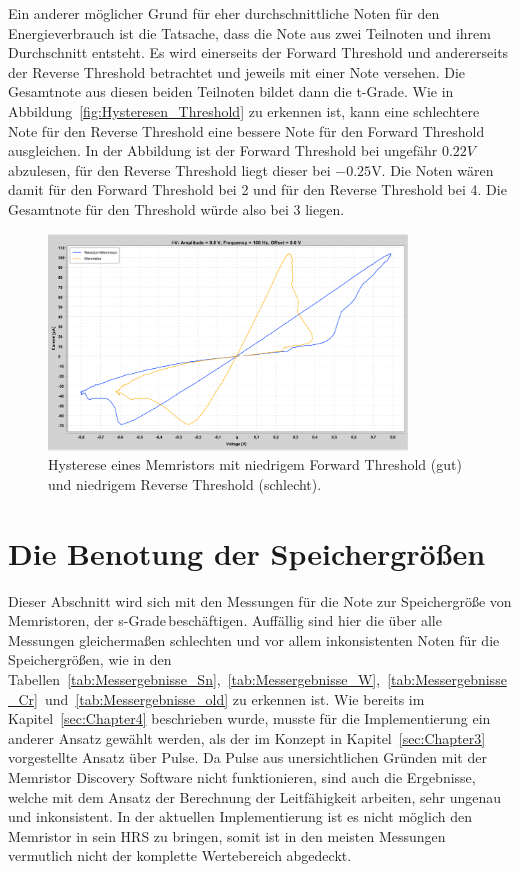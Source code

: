 Ein anderer möglicher Grund für eher durchschnittliche Noten für den Energieverbrauch ist die Tatsache, dass die Note aus zwei Teilnoten und ihrem Durchschnitt entsteht. Es wird einerseits der Forward Threshold und andererseits der Reverse Threshold betrachtet und jeweils mit einer Note versehen. Die Gesamtnote aus diesen beiden Teilnoten bildet dann die t-Grade. Wie in Abbildung~\ref{fig:Hysteresen_Threshold} zu erkennen ist, kann eine schlechtere Note für den Reverse Threshold eine bessere Note für den Forward Threshold ausgleichen. In der Abbildung ist der Forward Threshold bei ungefähr $0.22V$ abzulesen, für den Reverse Threshold liegt dieser bei $-0.25$V. Die Noten wären damit für den Forward Threshold bei 2 und für den Reverse Threshold bei 4. Die Gesamtnote für den Threshold würde also bei 3 liegen.

\begin{figure}
  \centering
    \includegraphics[width=0.85\textwidth]{images/Threshold_Hysterese2.png}
  \caption{Hysterese eines Memristors mit niedrigem Forward Threshold (gut) und niedrigem Reverse Threshold (schlecht).}
  \label{fig:Hysteresen_Threshold2}
\end{figure}

\section{Die Benotung der Speichergrößen}
Dieser Abschnitt wird sich mit den Messungen für die Note zur Speichergröße von Memristoren, der \glqq s-Grade\grqq\,beschäftigen. Auffällig sind hier die über alle Messungen gleichermaßen schlechten und vor allem inkonsistenten Noten für die Speichergrößen, wie in den Tabellen~\ref{tab:Messergebnisse_Sn},~\ref{tab:Messergebnisse_W},~\ref{tab:Messergebnisse_Cr}~und~\ref{tab:Messergebnisse_old}
zu erkennen ist. Wie bereits im Kapitel~\ref{sec:Chapter4} beschrieben wurde, musste für die Implementierung ein anderer Ansatz gewählt werden, als der im Konzept in Kapitel~\ref{sec:Chapter3} vorgestellte Ansatz über Pulse. Da Pulse aus unersichtlichen Gründen mit der Memristor Discovery Software nicht funktionieren, sind auch die Ergebnisse, welche mit dem Ansatz der Berechnung der Leitfähigkeit arbeiten, sehr ungenau und inkonsistent. In der aktuellen Implementierung ist es nicht möglich den Memristor in sein HRS zu bringen, somit ist in den meisten Messungen vermutlich nicht der komplette Wertebereich abgedeckt.

